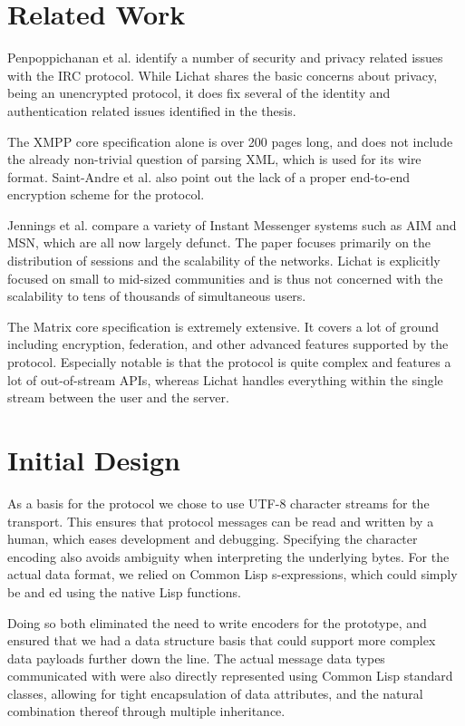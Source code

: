 \documentclass[format=sigconf]{acmart}
\begin{document}
\section{Related Work}\label{relatedwork}
Penpoppichanan et al.\cite{penpoppichanan2001security} identify a number of security and privacy related issues with the IRC protocol. While Lichat shares the basic concerns about privacy, being an unencrypted protocol, it does fix several of the identity and authentication related issues identified in the thesis.

The XMPP core specification\cite{saint2004extensible} alone is over 200 pages long, and does not include the already non-trivial question of parsing XML, which is used for its wire format. Saint-Andre et al.\cite{saint2009xmpp} also point out the lack of a proper end-to-end encryption scheme for the protocol.

Jennings et al.\cite{jennings2006study} compare a variety of Instant Messenger systems such as AIM and MSN, which are all now largely defunct. The paper focuses primarily on the distribution of sessions and the scalability of the networks. Lichat is explicitly focused on small to mid-sized communities and is thus not concerned with the scalability to tens of thousands of simultaneous users.

The Matrix core specification\cite{matrix} is extremely extensive. It covers a lot of ground including encryption, federation, and other advanced features supported by the protocol. Especially notable is that the protocol is quite complex and features a lot of out-of-stream APIs, whereas Lichat handles everything within the single stream between the user and the server.

\section{Initial Design}\label{initial-design}
As a basis for the protocol we chose to use UTF-8 character streams for the transport. This ensures that protocol messages can be read and written by a human, which eases development and debugging. Specifying the character encoding also avoids ambiguity when interpreting the underlying bytes. For the actual data format, we relied on Common Lisp s-expressions, which could simply be  and ed using the native Lisp functions.

Doing so both eliminated the need to write encoders for the prototype, and ensured that we had a data structure basis that could support more complex data payloads further down the line. The actual message data types communicated with were also directly represented using Common Lisp standard classes, allowing for tight encapsulation of data attributes, and the natural combination thereof through multiple inheritance.
\end{document}
